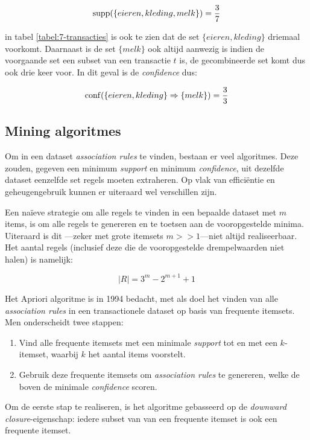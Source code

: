 \begin{equation}
\operatorname{supp}(\{eieren, kleding, melk\}) = \frac{3}{7}
\end{equation}

in tabel \ref{tabel:7-transacties} is ook te zien dat de set $\{eieren, kleding\}$ driemaal voorkomt. Daarnaast is de set $\{melk\}$ ook altijd aanwezig is indien de voorgaande set een subset van een transactie $t$ is, de gecombineerde set komt dus ook drie keer voor. In dit geval is de \emph{confidence} dus:

\begin{equation}
\operatorname{conf}(\{eieren, kleding\} \Rightarrow \{melk\}) = \frac{3}{3}
\end{equation}
%
\subsection{Mining algoritmes}
Om in een dataset \emph{association rules} te vinden, bestaan er veel algoritmes. Deze zouden, gegeven een minimum \emph{support} en minimum \emph{confidence}, uit dezelfde dataset eenzelfde set regels moeten extraheren. Op vlak van effici\"entie en geheugengebruik kunnen er uiteraard wel verschillen zijn. 

Een na\"ieve strategie om alle regels te vinden in een bepaalde dataset met $m$ items, is om alle regels te genereren en te toetsen aan de vooropgestelde minima. Uiteraard is dit ---zeker met grote itemsets $m >> 1$---niet altijd realiseerbaar. Het aantal regels (inclusief deze die de vooropgestelde drempelwaarden niet halen) is namelijk:

\begin{equation}
|R| = 3^m - 2^{m + 1} + 1
\end{equation}

Het Apriori algoritme is in 1994 bedacht, met als doel het vinden van alle \emph{association rules} in een transactionele dataset op basis van frequente itemsets. Men onderscheidt twee stappen:

\begin{enumerate}
\item Vind alle frequente itemsets met een minimale \emph{support} tot en met een $k$-itemset, waarbij $k$ het aantal items voorstelt.
\item Gebruik deze frequente itemsets om \emph{association rules} te genereren, welke de boven de minimale \emph{confidence} scoren.
\end{enumerate}

Om de eerste stap te realiseren, is het algoritme gebasseerd op de \emph{downward closure}-eigenschap: iedere subset van van een frequente itemset is ook een frequente itemset. 

